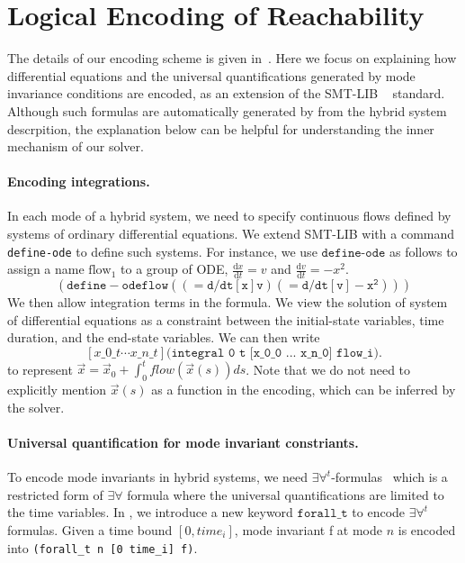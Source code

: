 \section{Logical Encoding of Reachability}


The details of our encoding scheme is given in~\cite{DBLP:journals/corr/GaoKCC14}.
Here we focus on explaining how differential equations and the universal quantifications
generated by mode invariance conditions are encoded, as an extension of the SMT-LIB
~\cite{BarST-SMT-10} standard. Although such formulas are automatically generated by \dReach{}
from the hybrid system descrpition, the explanation below can be helpful for
understanding the inner mechanism of our solver.

\paragraph{Encoding integrations.}
In each mode of a hybrid system, we need to specify continuous flows defined
by systems of ordinary differential equations. We extend SMT-LIB with a command
\texttt{define-ode} to define such systems. For instance, we use $\texttt{define-ode}$ as follows to
assign a name $\mathrm{flow_1}$ to a group of ODE,
$\frac{\mathrm{d}x}{\mathrm{d}t} = v$ and
$\frac{\mathrm{d}v}{\mathrm{d}t} = -x^2$.
\[
\mathtt{(define-ode flow ((= d/dt[x] v) (= d/dt[v] -x^2)))}
\]
We then allow integration terms in the formula. We view the solution of system of differential equations
as a constraint between the initial-state variables, time duration, and the end-state variables. We can then write
\[
[x\_0\_t \cdots x\_n\_t]\texttt{(integral 0 t [x\_0\_0 ... x\_n\_0] flow\_i)}.
\]
to represent
$\vec x = \vec x_0 + \int_0^t flow(\vec x(s))ds$. Note that we do not need to explicitly mention $\vec x(s)$ as a function in the encoding, which can be inferred by the solver.

\paragraph{Universal quantification for mode invariant constriants.} To encode mode invariants in hybrid systems, we
need $\exists\forall^t$-formulas~\cite{DBLP:conf/fmcad/GaoKC13} which
is a restricted form of $\exists\forall$ formula where the universal
quantifications are limited to the time variables. In \drh{}, we
introduce a new keyword $\texttt{forall\_t}$ to encode
$\exists\forall^t$ formulas. Given a time bound $[0, time_i]$, mode
invariant f at mode $n$ is encoded into \texttt{(forall\_t n [0
  time\_i] f)}.

